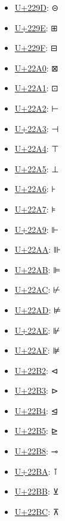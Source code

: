 \begin{itemize}
	\item \href{https://decodeunicode.org/en/u+229D}{U+229D}: ⊝
	\item \href{https://decodeunicode.org/en/u+229E}{U+229E}: ⊞
	\item \href{https://decodeunicode.org/en/u+229F}{U+229F}: ⊟
	\item \href{https://decodeunicode.org/en/u+22A0}{U+22A0}: ⊠
	\item \href{https://decodeunicode.org/en/u+22A1}{U+22A1}: ⊡
	\item \href{https://decodeunicode.org/en/u+22A2}{U+22A2}: ⊢
	\item \href{https://decodeunicode.org/en/u+22A3}{U+22A3}: ⊣
	\item \href{https://decodeunicode.org/en/u+22A4}{U+22A4}: ⊤
	\item \href{https://decodeunicode.org/en/u+22A5}{U+22A5}: ⊥
	\item \href{https://decodeunicode.org/en/u+22A6}{U+22A6}: ⊦
	\item \href{https://decodeunicode.org/en/u+22A7}{U+22A7}: ⊧
	\item \href{https://decodeunicode.org/en/u+22A9}{U+22A9}: ⊩
	\item \href{https://decodeunicode.org/en/u+22AA}{U+22AA}: ⊪
	\item \href{https://decodeunicode.org/en/u+22AB}{U+22AB}: ⊫
	\item \href{https://decodeunicode.org/en/u+22AC}{U+22AC}: ⊬
	\item \href{https://decodeunicode.org/en/u+22AD}{U+22AD}: ⊭
	\item \href{https://decodeunicode.org/en/u+22AE}{U+22AE}: ⊮
	\item \href{https://decodeunicode.org/en/u+22AF}{U+22AF}: ⊯
	\item \href{https://decodeunicode.org/en/u+22B2}{U+22B2}: ⊲
	\item \href{https://decodeunicode.org/en/u+22B3}{U+22B3}: ⊳
	\item \href{https://decodeunicode.org/en/u+22B4}{U+22B4}: ⊴
	\item \href{https://decodeunicode.org/en/u+22B5}{U+22B5}: ⊵
	\item \href{https://decodeunicode.org/en/u+22B8}{U+22B8}: ⊸
	\item \href{https://decodeunicode.org/en/u+22BA}{U+22BA}: ⊺
	\item \href{https://decodeunicode.org/en/u+22BB}{U+22BB}: ⊻
	\item \href{https://decodeunicode.org/en/u+22BC}{U+22BC}: ⊼

\end{itemize}
